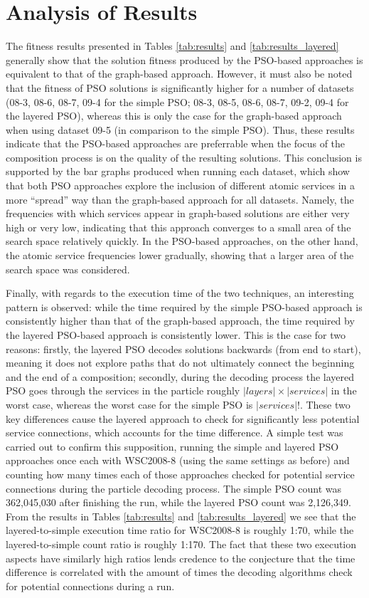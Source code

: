 \documentclass{llncs}
\begin{document}
\section{Analysis of Results} %

The fitness results presented in Tables \ref{tab:results} and \ref{tab:results_layered} generally show that the solution fitness produced by the PSO-based approaches is equivalent to that of the graph-based approach. However, it must also be noted that the fitness of PSO solutions is significantly higher for a number of datasets (08-3, 08-6, 08-7, 09-4 for the simple PSO; 08-3, 08-5, 08-6, 08-7, 09-2, 09-4 for the layered PSO), whereas this is only the case for the graph-based approach when using dataset 09-5 (in comparison to the simple PSO). Thus, these results indicate that the PSO-based approaches are preferrable when the focus of the composition process is on the quality of the resulting solutions. This conclusion is supported by the bar graphs produced when running each dataset, which show that both PSO approaches explore the inclusion of different atomic services in a more ``spread'' way than the graph-based approach for all datasets. Namely, the frequencies with which services appear in graph-based solutions are either very high or very low, indicating that this approach converges to a small area of the search space relatively quickly. In the PSO-based approaches, on the other hand, the atomic service frequencies lower gradually, showing that a larger area of the search space was considered.

Finally, with regards to the execution time of the two techniques, an interesting pattern is observed: while the time required by the simple PSO-based approach is consistently higher than that of the graph-based approach, the time required by the layered PSO-based approach is consistently lower. This is the case for two reasons: firstly, the layered PSO decodes solutions backwards (from end to start), meaning it does not explore paths that do not ultimately connect the beginning and the end of a composition; secondly, during the decoding process the layered PSO goes through the services in the particle roughly $|layers| \times |services|$ in the worst case, whereas the worst case for the simple PSO is $|services|!$. These two key differences cause the layered approach to check for significantly less potential service connections, which accounts for the time difference. A simple test was carried out to confirm this supposition, running the simple and layered PSO approaches once each with WSC2008-8 (using the same settings as before) and counting how many times each of those approaches checked for potential service connections during the particle decoding process. The simple PSO count was 362,045,030 after finishing the run, while the layered PSO count was 2,126,349. From the results in Tables \ref{tab:results} and \ref{tab:results_layered} we see that the layered-to-simple execution time ratio for WSC2008-8 is roughly 1:70, while the layered-to-simple count ratio is roughly 1:170. The fact that these two execution aspects have similarly high ratios lends credence to the conjecture that the time difference is correlated with the amount of times the decoding algorithms check for potential connections during a run.
\end{document}
